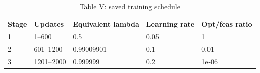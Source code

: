 \begin{table}[htbp]
\centering
\caption{Table V: saved training schedule}
\begin{tabular}{lllll}
\toprule
Stage & Updates & Equivalent lambda & Learning rate & Opt/feas ratio \\
\midrule
1 & 1--600 & 0.5 & 0.05 & 1 \\
2 & 601--1200 & 0.99009901 & 0.1 & 0.01 \\
3 & 1201--2000 & 0.999999 & 0.2 & 1e-06 \\
\bottomrule
\end{tabular}
\end{table}


